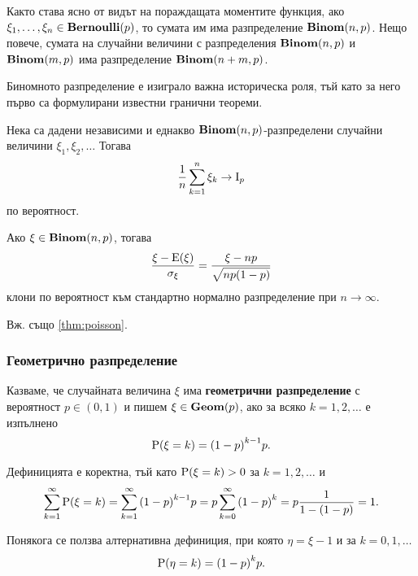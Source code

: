 \documentclass{../../common/topic}
\begin{document}
Както става ясно от видът на пораждащата моментите функция, ако \( \xi_1, \ldots, \xi_n \in \operatorname{\mathbf{Bernoulli}}(p) \), то сумата им има разпределение \( \operatorname{\mathbf{Binom}}(n, p) \). Нещо повече, сумата на случайни величини с разпределения \( \operatorname{\mathbf{Binom}}(n, p) \) и \( \operatorname{\mathbf{Binom}}(m, p) \) има разпределение \( \operatorname{\mathbf{Binom}}(n + m, p) \).

Биномното разпределение е изиграло важна историческа роля, тъй като за него първо са формулирани известни гранични теореми.

\begin{theorem}\label{thm:bernoulli}
  Нека са дадени независими и еднакво \( \operatorname{\mathbf{Binom}}(n, p) \)-разпределени случайни величини \( \xi_1, \xi_2, \ldots \) Тогава
  \begin{equation*}
    \frac 1 n \sum_{k=1}^n \xi_k
    \to
    \operatorname{I}_p
  \end{equation*}
  по вероятност.
\end{theorem}

\begin{theorem}\label{thm:moivre_laplace}
  Ако \( \xi \in \operatorname{\mathbf{Binom}}(n, p) \), тогава
  \begin{equation*}
    \frac {\xi - \operatorname{E}(\xi)} {\sigma_\xi}
    =
    \frac {\xi - np} {\sqrt{np(1-p)}}
  \end{equation*}
  клони по вероятност към стандартно нормално разпределение при \( n \to \infty \).
\end{theorem}

Вж. също \cref{thm:poisson}.

\subsubsection{Геометрично разпределение}\label{sec:geom}

\begin{definition}
  Казваме, че случайната величина \( \xi \) има \textbf{геометрични разпределение} с вероятност \( p \in (0, 1) \) и пишем \( \xi \in \operatorname{\mathbf{Geom}}(p) \), ако за всяко \( k = 1, 2, \ldots \) е изпълнено
  \begin{equation*}
    \operatorname{P}(\xi = k) = {(1-p)}^{k-1} p.
  \end{equation*}

  Дефиницията е коректна, тъй като \( \operatorname{P}(\xi = k) > 0 \) за \( k = 1, 2, \ldots \) и
  \begin{equation*}
    \sum_{k=1}^\infty \operatorname{P}(\xi = k)
    =
    \sum_{k=1}^\infty {(1-p)}^{k-1} p
    =
    p \sum_{k=0}^\infty {(1-p)}^k
    =
    p \frac 1 {1-(1-p)}
    =
    1.
  \end{equation*}

  Понякога се ползва алтернативна дефиниция, при която \( \eta = \xi - 1 \) и за \( k = 0, 1, \ldots \)
  \begin{equation*}
    \operatorname{P}(\eta = k) = {(1-p)}^k p.
  \end{equation*}
\end{definition}
\end{document}
